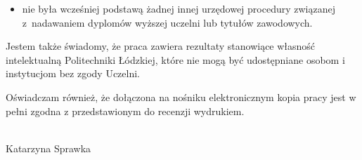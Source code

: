 \begin{spacing}{1.2}
\begin{itemize}
			\item nie była wcześniej podstawą żadnej innej urzędowej procedury związanej z~na\-dawaniem dyplomów wyższej uczelni lub tytułów zawodowych.
		\end{itemize}
	
	\noindent Jestem także świadomy, że praca zawiera rezultaty stanowiące własność intelektualną Politechniki Łódzkiej, które nie mogą być udostępniane osobom i instytucjom bez zgody Uczelni.
	
	Oświadczam również, że dołączona na nośniku elektronicznym kopia pracy jest w pełni zgodna z przedstawionym do recenzji wydrukiem.
	
	\vspace{1.5cm}
	\hspace{9cm} \dotfill \\
	\vspace{-0.45cm}
	\hspace{10.5cm}
	Katarzyna Sprawka

\end{spacing}
